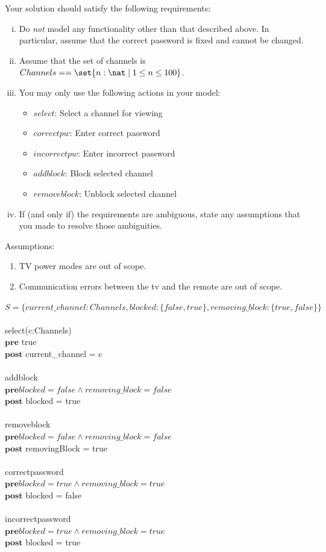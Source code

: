 \documentclass{article}
\begin{document}
\begin{enumerate}
Your solution should satisfy the following requirements:
\begin{enumerate}[i.]
\item Do \emph{not} model any functionality other than that described above. In particular, assume that the correct password is fixed and cannot be changed.
\item Assume that the set of channels is $Channels == \set{n:\nat \mid 1 \leq n \leq 100}$.
\item You may only use the following actions in your model:
    \begin{itemize}
    \item $select$: Select a channel for viewing
    \item $correctpw$: Enter correct password
    \item $incorrectpw$: Enter incorrect password
    \item $addblock$: Block selected channel
    \item $removeblock$: Unblock selected channel
    \end{itemize}
  \item If (and only if) the requirements are ambiguous, state any assumptions that you made to resolve those ambiguities. \\
\end{enumerate}
Assumptions:
\begin{enumerate}
\item TV power modes are out of scope.
\item Communication errors between the tv and the remote are out of scope.
\end{enumerate}

$S = \{ current\_channel: Channels, blocked: \{false,true\}, removing\_block: \{true, false \}  \}  $ \\
\\
select(c:Channels) \\
$\textbf{pre}$ true \\
$\textbf{post}$ current\_channel = c \\
\\
addblock \\
$\textbf{pre} blocked = false \land removing\_block = false$  \\
$\textbf{post}$ blocked = true \\
\\
removeblock \\
$\textbf{pre} blocked = false \land removing\_block = false$ \\
$\textbf{post}$ removingBlock = true \\
\\
correctpassword \\
$\textbf{pre} blocked = true \land removing\_block = true $ \\
$\textbf{post}$ blocked = false\\
\\
incorrectpassword \\
$\textbf{pre} blocked = true \land removing\_block = true $ \\
$\textbf{post}$ blocked = true \\
\\
\end{enumerate}
\end{document}
